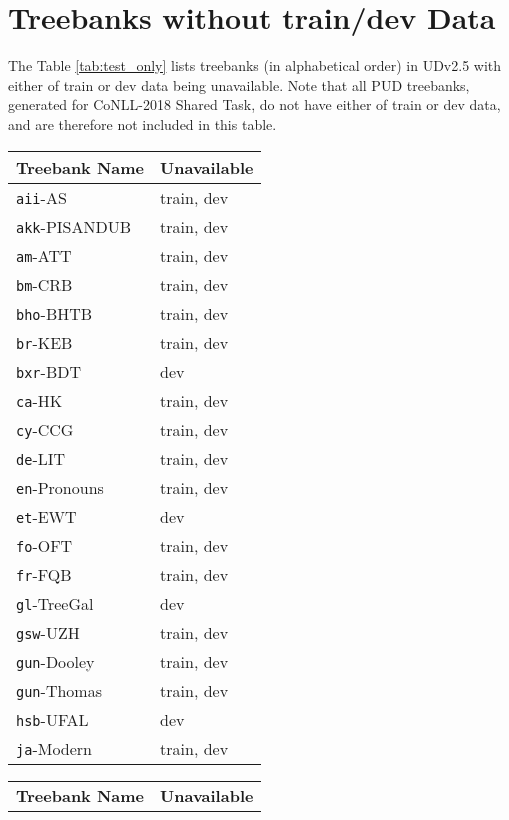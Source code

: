 \newpage

\section{Treebanks without train/dev Data}
\label{app:treebank_data}

The Table \ref{tab:test_only} lists treebanks (in alphabetical order) in UDv2.5 with either of train or dev data being unavailable. Note that all PUD treebanks, generated for CoNLL-2018 Shared Task, do not have either of train or dev data, and are therefore not included in this table.

\begin{table}[H]
\centering
    \begin{tabular}{|l|l|}
    \hline 
    \textbf{Treebank Name} & \textbf{Unavailable} \\
    \hline 
    \hline
    \texttt{aii}-AS & train, dev \\
    \texttt{akk}-PISANDUB & train, dev \\
    \texttt{am}-ATT & train, dev \\
    \texttt{bm}-CRB & train, dev \\
    \texttt{bho}-BHTB & train, dev \\
    \texttt{br}-KEB & train, dev \\
    \texttt{bxr}-BDT & dev \\
    \texttt{ca}-HK & train, dev \\
    \texttt{cy}-CCG & train, dev \\
    \texttt{de}-LIT & train, dev \\
    \texttt{en}-Pronouns & train, dev \\
    \texttt{et}-EWT & dev \\
    \texttt{fo}-OFT & train, dev \\
    \texttt{fr}-FQB & train, dev \\
    \texttt{gl}-TreeGal & dev \\
    \texttt{gsw}-UZH & train, dev \\
    \texttt{gun}-Dooley & train, dev \\
    \texttt{gun}-Thomas & train, dev \\
    \texttt{hsb}-UFAL & dev \\
    \texttt{ja}-Modern & train, dev \\
    \hline
    \end{tabular}
    \begin{tabular}{|l|l|}
    \hline 
    \textbf{Treebank Name} & \textbf{Unavailable} \\

\end{tabular}
\end{table}
